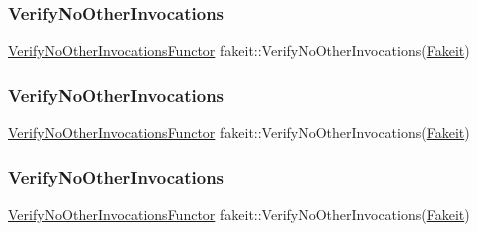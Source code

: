 \mbox{\label{namespacefakeit_a1fdaffe6f7ef1789d8ef832cc4cc19c3}} 
\subsubsection{\texorpdfstring{VerifyNoOtherInvocations}{VerifyNoOtherInvocations}\hspace{0.1cm}{\footnotesize\ttfamily [5/9]}}
{\footnotesize\ttfamily \mbox{\hyperlink{classfakeit_1_1VerifyNoOtherInvocationsFunctor}{Verify\+No\+Other\+Invocations\+Functor}} fakeit\+::\+Verify\+No\+Other\+Invocations(\mbox{\hyperlink{single__header_2tpunit_2fakeit_8hpp_a2b1f324059bec9d07841630bd5c2e7bc}{Fakeit}})\hspace{0.3cm}{\ttfamily [static]}}

\mbox{\label{namespacefakeit_a1fdaffe6f7ef1789d8ef832cc4cc19c3}} 
\subsubsection{\texorpdfstring{VerifyNoOtherInvocations}{VerifyNoOtherInvocations}\hspace{0.1cm}{\footnotesize\ttfamily [6/9]}}
{\footnotesize\ttfamily \mbox{\hyperlink{classfakeit_1_1VerifyNoOtherInvocationsFunctor}{Verify\+No\+Other\+Invocations\+Functor}} fakeit\+::\+Verify\+No\+Other\+Invocations(\mbox{\hyperlink{single__header_2tpunit_2fakeit_8hpp_a2b1f324059bec9d07841630bd5c2e7bc}{Fakeit}})\hspace{0.3cm}{\ttfamily [static]}}

\mbox{\label{namespacefakeit_a1fdaffe6f7ef1789d8ef832cc4cc19c3}} 
\subsubsection{\texorpdfstring{VerifyNoOtherInvocations}{VerifyNoOtherInvocations}\hspace{0.1cm}{\footnotesize\ttfamily [7/9]}}
{\footnotesize\ttfamily \mbox{\hyperlink{classfakeit_1_1VerifyNoOtherInvocationsFunctor}{Verify\+No\+Other\+Invocations\+Functor}} fakeit\+::\+Verify\+No\+Other\+Invocations(\mbox{\hyperlink{single__header_2tpunit_2fakeit_8hpp_a2b1f324059bec9d07841630bd5c2e7bc}{Fakeit}})\hspace{0.3cm}{\ttfamily [static]}}

